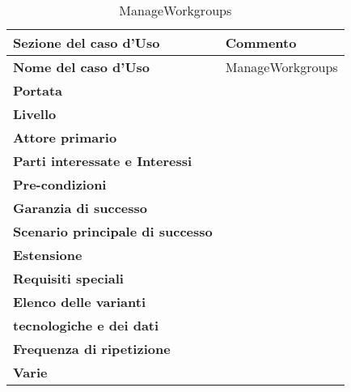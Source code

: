 \documentclass[12pt]{scrartcl}
\begin{document}
\begin{table}[h!]
  \caption{ManageWorkgroups}
  \label{tab:table6}
  \begin{tabular}{|l|l|}
    \toprule
    \textbf{Sezione del caso d'Uso} & \textbf{Commento}\\
    \midrule
    \textbf{Nome del caso d'Uso} & ManageWorkgroups\\
    \midrule
    \textbf{Portata} & \\
    \midrule
    \textbf{Livello} & \\
    \midrule
    \textbf{Attore primario} & \\
    \midrule
    \textbf{Parti interessate e Interessi} & \\
    \midrule
    \textbf{Pre-condizioni} & \\
    \midrule
    \textbf{Garanzia di successo} & \\
    \midrule
    \textbf{Scenario principale di successo} & \\
    \midrule
    \textbf{Estensione} & \\
    \midrule
    \textbf{Requisiti speciali} & \\
    \midrule
    \textbf{Elenco delle varianti}\\ \textbf{tecnologiche e dei dati} & \\
    \midrule
    \textbf{Frequenza di ripetizione} & \\
    \textbf{Varie} & \\
    \bottomrule
  \end{tabular}
\end{table}
\end{document}
